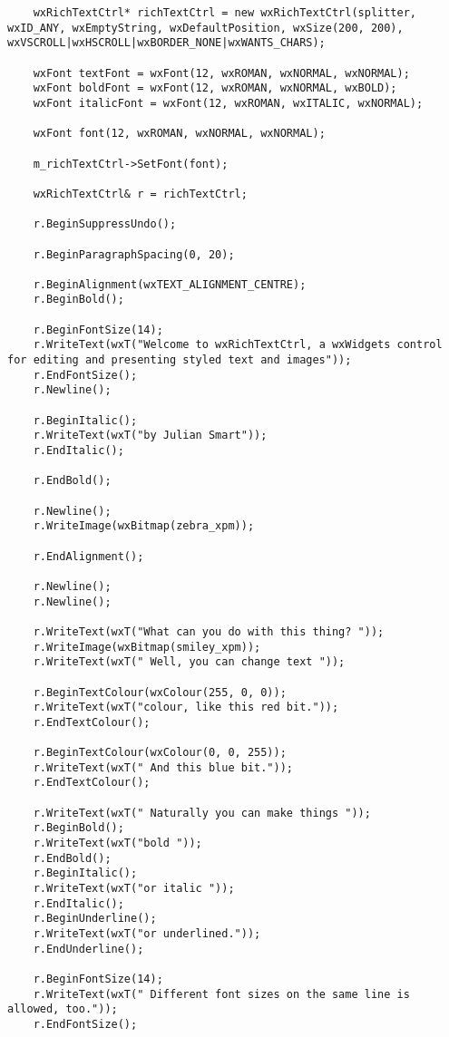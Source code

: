 {\small
\begin{verbatim}
    wxRichTextCtrl* richTextCtrl = new wxRichTextCtrl(splitter, wxID_ANY, wxEmptyString, wxDefaultPosition, wxSize(200, 200), wxVSCROLL|wxHSCROLL|wxBORDER_NONE|wxWANTS_CHARS);

    wxFont textFont = wxFont(12, wxROMAN, wxNORMAL, wxNORMAL);
    wxFont boldFont = wxFont(12, wxROMAN, wxNORMAL, wxBOLD);
    wxFont italicFont = wxFont(12, wxROMAN, wxITALIC, wxNORMAL);

    wxFont font(12, wxROMAN, wxNORMAL, wxNORMAL);

    m_richTextCtrl->SetFont(font);

    wxRichTextCtrl& r = richTextCtrl;

    r.BeginSuppressUndo();

    r.BeginParagraphSpacing(0, 20);

    r.BeginAlignment(wxTEXT_ALIGNMENT_CENTRE);
    r.BeginBold();

    r.BeginFontSize(14);
    r.WriteText(wxT("Welcome to wxRichTextCtrl, a wxWidgets control for editing and presenting styled text and images"));
    r.EndFontSize();
    r.Newline();

    r.BeginItalic();
    r.WriteText(wxT("by Julian Smart"));
    r.EndItalic();

    r.EndBold();

    r.Newline();
    r.WriteImage(wxBitmap(zebra_xpm));

    r.EndAlignment();

    r.Newline();
    r.Newline();

    r.WriteText(wxT("What can you do with this thing? "));
    r.WriteImage(wxBitmap(smiley_xpm));
    r.WriteText(wxT(" Well, you can change text "));

    r.BeginTextColour(wxColour(255, 0, 0));
    r.WriteText(wxT("colour, like this red bit."));
    r.EndTextColour();

    r.BeginTextColour(wxColour(0, 0, 255));
    r.WriteText(wxT(" And this blue bit."));
    r.EndTextColour();

    r.WriteText(wxT(" Naturally you can make things "));
    r.BeginBold();
    r.WriteText(wxT("bold "));
    r.EndBold();
    r.BeginItalic();
    r.WriteText(wxT("or italic "));
    r.EndItalic();
    r.BeginUnderline();
    r.WriteText(wxT("or underlined."));
    r.EndUnderline();

    r.BeginFontSize(14);
    r.WriteText(wxT(" Different font sizes on the same line is allowed, too."));
    r.EndFontSize();


\end{verbatim}}
